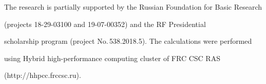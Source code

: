 










\Ack

\noindent

The research is partially supported by the Russian Foundation for Basic Research

(projects 18-29-03100 and 19-07-00352) and the RF Presidential 

scholarship program (project No.\,538.2018.5). The calculations were performed 

using Hybrid high-performance computing cluster of FRC CSC RAS 

({\sf http://hhpcc.frccsc.ru}).








